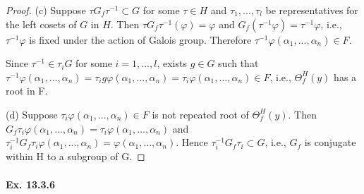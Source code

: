 \documentclass[11pt,a4paper]{article}
\begin{document}
{\begin{proof}
\item[(c)] Suppose $\tau G_f \tau^{-1} \subset G$ for some $\tau \in H$ and $\tau_1,...,\tau_l$ be representatives for the left cosets of $G$ in $H$. Then $\tau G_f \tau^{-1}(\varphi)=\varphi$ and $G_f (\tau^{-1}\varphi)=\tau^{-1}\varphi$, i.e., $\tau^{-1}\varphi$ is fixed under the action of Galois group.
Therefore $\tau^{-1}\varphi(\alpha_1,...,\alpha_n) \in F$.

Since $\tau^{-1}\in \tau_i G$ for some $i=1,...,l$, exists $g\in G$ such that $\tau^{-1}\varphi(\alpha_1,...,\alpha_n)=\tau_i g \varphi(\alpha_1,...,\alpha_n) = \tau_i \varphi(\alpha_1,...,\alpha_n)  \in F$, i.e., $\Theta_f^H(y)$ has a root in F.

\item[(d)]  Suppose $\tau_i\varphi(\alpha_1,...,\alpha_n) \in F$ is not repeated root of $\Theta_f^H(y)$. Then $G_f \tau_i \varphi(\alpha_1,...,\alpha_n) = \tau_i \varphi(\alpha_1,...,\alpha_n)$ and $\tau_i ^{-1} G_f \tau_i \varphi(\alpha_1,...,\alpha_n) = \varphi(\alpha_1,...,\alpha_n)$. Hence $\tau_i ^{-1} G_f \tau_i \subset G$, i.e., $G_f$ is conjugate within H to a subgroup of G. 

\end{proof}
}

\paragraph{Ex. 13.3.6}
\end{document}
